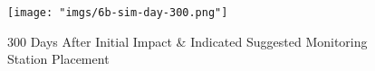 \documentclass[11pt]{article}
\begin{document}
\begin{figure}[htbp]
    \centering
    \texttt{[image: "imgs/6b-sim-day-300.png"]} %
    \caption{300 Days After Initial Impact \& Indicated Suggested Monitoring Station Placement}
    \label{fig:6b-sim-day-300}
\end{figure}
\FloatBarrier



\vspace{2em}

\newpage
{}

\nocite{*}
\printbibliography
\end{document}
